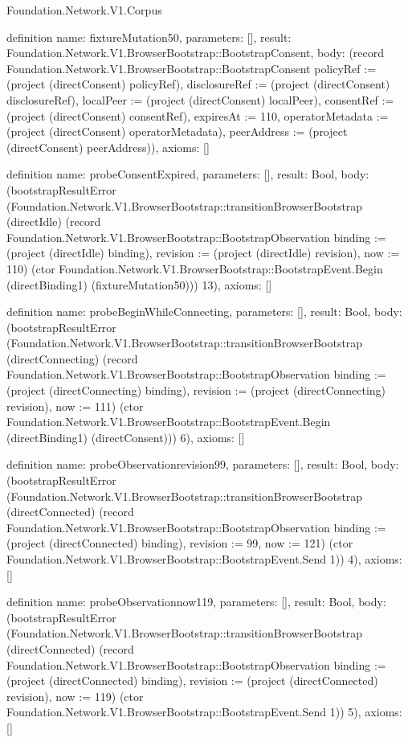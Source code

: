 \begin{lexlean}{Foundation.Network.V1.Corpus}
\begin{semanticmodule}
definition{
  name: fixtureMutation50,
  parameters: [],
  result: Foundation.Network.V1.BrowserBootstrap::BootstrapConsent,
  body: (record Foundation.Network.V1.BrowserBootstrap::BootstrapConsent {policyRef := (project (directConsent) policyRef), disclosureRef := (project (directConsent) disclosureRef), localPeer := (project (directConsent) localPeer), consentRef := (project (directConsent) consentRef), expiresAt := 110, operatorMetadata := (project (directConsent) operatorMetadata), peerAddress := (project (directConsent) peerAddress)}),
  axioms: []
}

definition{
  name: probeConsentExpired,
  parameters: [],
  result: Bool,
  body: (bootstrapResultError (Foundation.Network.V1.BrowserBootstrap::transitionBrowserBootstrap (directIdle) (record Foundation.Network.V1.BrowserBootstrap::BootstrapObservation {binding := (project (directIdle) binding), revision := (project (directIdle) revision), now := 110}) (ctor Foundation.Network.V1.BrowserBootstrap::BootstrapEvent.Begin (directBinding1) (fixtureMutation50))) 13),
  axioms: []
}

definition{
  name: probeBeginWhileConnecting,
  parameters: [],
  result: Bool,
  body: (bootstrapResultError (Foundation.Network.V1.BrowserBootstrap::transitionBrowserBootstrap (directConnecting) (record Foundation.Network.V1.BrowserBootstrap::BootstrapObservation {binding := (project (directConnecting) binding), revision := (project (directConnecting) revision), now := 111}) (ctor Foundation.Network.V1.BrowserBootstrap::BootstrapEvent.Begin (directBinding1) (directConsent))) 6),
  axioms: []
}

definition{
  name: probeObservationrevision99,
  parameters: [],
  result: Bool,
  body: (bootstrapResultError (Foundation.Network.V1.BrowserBootstrap::transitionBrowserBootstrap (directConnected) (record Foundation.Network.V1.BrowserBootstrap::BootstrapObservation {binding := (project (directConnected) binding), revision := 99, now := 121}) (ctor Foundation.Network.V1.BrowserBootstrap::BootstrapEvent.Send 1)) 4),
  axioms: []
}

definition{
  name: probeObservationnow119,
  parameters: [],
  result: Bool,
  body: (bootstrapResultError (Foundation.Network.V1.BrowserBootstrap::transitionBrowserBootstrap (directConnected) (record Foundation.Network.V1.BrowserBootstrap::BootstrapObservation {binding := (project (directConnected) binding), revision := (project (directConnected) revision), now := 119}) (ctor Foundation.Network.V1.BrowserBootstrap::BootstrapEvent.Send 1)) 5),
  axioms: []
}


\end{semanticmodule}
\end{lexlean}

